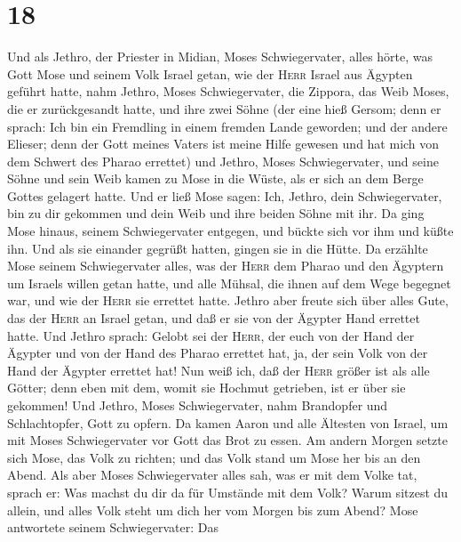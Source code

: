 \hypertarget{section-17}{%
\section{18}\label{section-17}}

 Und als Jethro, der Priester in Midian, Moses
Schwiegervater, alles hörte, was Gott Mose und seinem Volk Israel getan,
wie der \textsc{Herr} Israel aus Ägypten geführt hatte, 
nahm Jethro, Moses Schwiegervater, die Zippora, das Weib Moses, die er
zurückgesandt hatte,  und ihre zwei Söhne (der eine hieß
Gersom; denn er sprach: Ich bin ein Fremdling in einem fremden Lande
geworden;  und der andere Elieser; denn der Gott meines
Vaters ist meine Hilfe gewesen und hat mich von dem Schwert des Pharao
errettet)  und Jethro, Moses Schwiegervater, und seine
Söhne und sein Weib kamen zu Mose in die Wüste, als er sich an dem Berge
Gottes gelagert hatte.  Und er ließ Mose sagen: Ich,
Jethro, dein Schwiegervater, bin zu dir gekommen und dein Weib und ihre
beiden Söhne mit ihr.  Da ging Mose hinaus, seinem
Schwiegervater entgegen, und bückte sich vor ihm und küßte ihn. Und als
sie einander gegrüßt hatten, gingen sie in die Hütte.  Da
erzählte Mose seinem Schwiegervater alles, was der \textsc{Herr} dem
Pharao und den Ägyptern um Israels willen getan hatte, und alle Mühsal,
die ihnen auf dem Wege begegnet war, und wie der \textsc{Herr} sie
errettet hatte.  Jethro aber freute sich über alles Gute,
das der \textsc{Herr} an Israel getan, und daß er sie von der Ägypter
Hand errettet hatte.  Und Jethro sprach: Gelobt sei der
\textsc{Herr}, der euch von der Hand der Ägypter und von der Hand des
Pharao errettet hat, ja, der sein Volk von der Hand der Ägypter errettet
hat!  Nun weiß ich, daß der \textsc{Herr} größer ist als
alle Götter; denn eben mit dem, womit sie Hochmut getrieben, ist er über
sie gekommen!  Und Jethro, Moses Schwiegervater, nahm
Brandopfer und Schlachtopfer, Gott zu opfern. Da kamen Aaron und alle
Ältesten von Israel, um mit Moses Schwiegervater vor Gott das Brot zu
essen.  Am andern Morgen setzte sich Mose, das Volk zu
richten; und das Volk stand um Mose her bis an den Abend.
 Als aber Moses Schwiegervater alles sah, was er mit dem
Volke tat, sprach er: Was machst du dir da für Umstände mit dem Volk?
Warum sitzest du allein, und alles Volk steht um dich her vom Morgen bis
zum Abend?  Mose antwortete seinem Schwiegervater: Das
